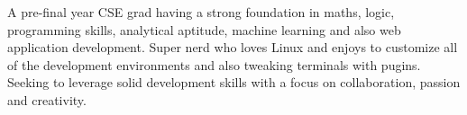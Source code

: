 

\begin{cvparagraph}

A pre-final year CSE grad having a strong foundation in maths, logic, programming skills, analytical aptitude, machine learning and also web application development. Super nerd who loves Linux and enjoys to customize all of the development environments and also tweaking terminals with pugins. Seeking to leverage solid development skills with a focus on collaboration, passion and creativity.
\end{cvparagraph}

